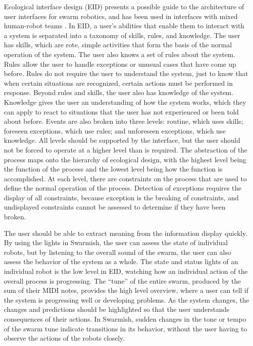 Ecological interface design (EID) presents a possible guide to the architecture of user interfaces for swarm robotics, and has been used in interfaces with mixed human-robot teams \citep{vicente1992ecological, gancet2010user}. 
In EID, a user's abilities that enable them to interact with a system is separated into a taxonomy of skills, rules, and knowledge. 
The user has skills, which are rote, simple activities that form the basis of the normal operation of the system. 
The user also knows a set of rules about the system. 
Rules allow the user to handle exceptions or unusual cases that have come up before. 
Rules do not require the user to understand the system, just to know that when certain situations are recognized, certain actions must be performed in response. 
Beyond rules and skills, the user also has knowledge of the system. 
Knowledge gives the user an understanding of how the system works, which they can apply to react to situations that the user has not experienced or been told about before. 
Events are also broken into three levels: routine, which uses skills; foreseen exceptions, which use rules; and unforeseen exceptions, which use knowledge. 
All levels should be supported by the interface, but the user should not be forced to operate at a higher level than is required. 
The abstraction of the process maps onto the hierarchy of ecological design, with the highest level being the function of the process and the lowest level being how the function is accomplished. 
At each level, there are constraints on the process that are used to define the normal operation of the process.
Detection of exceptions requires the display of all constraints, because exception is the breaking of constraints, and undisplayed constraints cannot be assessed to determine if they have been broken.

The user should be able to extract meaning from the information display quickly.
By using the lights in Swarmish, the user can assess the state of individual robots, but by listening to the overall sound of the swarm, the user can also assess the behavior of the system as a whole.
The state and status lights of an individual robot is the low level in EID, watching how an individual action of the overall process is progressing. 
The ``tune'' of the entire swarm, produced by the sum of their MIDI notes, provides the high level overview, where a user can tell if the system is progressing well or developing problems. 
As the system changes, the changes and predictions should be highlighted so that the user understands consequences of their actions. 
In Swarmish, sudden changes in the tone or tempo of the swarm tune indicate transitions in its behavior, without the user having to observe the actions of the robots closely. 

